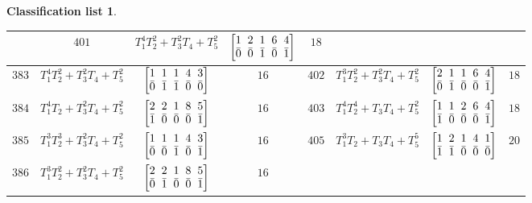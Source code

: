 \documentclass[10pt,a4paper]{amsart}
\theoremstyle{definition}
\newtheorem{class-list}[thm]{Classification list}
\numberwithin{equation}{section}
\begin{document}
\begin{class-list}
\begin{table}[h!]
\begin{tabu}{c|c|c|c||c|c|c|c}
&${401}$&${T_{1}^{4}T_{2}^{2}+T_{3}^{2}T_{4}+T_{5}^{2}}$
&$\arraycolsep=1mm\begin{bmatrix}{1} & {2} & {1} & {6} & {4} \\ {\bar{0}} & {\bar{0}} & {\bar{1}} & {\bar{0}} & {\bar{1}}\end{bmatrix}$&${18}$
\\
\hline
${383}$&${T_{1}^{4}T_{2}^{2}+T_{3}^{2}T_{4}+T_{5}^{2}}$
&$\arraycolsep=1mm\begin{bmatrix}{1} & {1} & {1} & {4} & {3} \\ {\bar{0}} & {\bar{1}} & {\bar{1}} & {\bar{0}} & {\bar{0}}\end{bmatrix}$&${16}$
&${402}$&${T_{1}^{3}T_{2}^{2}+T_{3}^{2}T_{4}+T_{5}^{2}}$
&$\arraycolsep=1mm\begin{bmatrix}{2} & {1} & {1} & {6} & {4} \\ {\bar{0}} & {\bar{1}} & {\bar{0}} & {\bar{0}} & {\bar{1}}\end{bmatrix}$&${18}$
\\
\hline
${384}$&${T_{1}^{4}T_{2}+T_{3}^{2}T_{4}+T_{5}^{2}}$
&$\arraycolsep=1mm\begin{bmatrix}{2} & {2} & {1} & {8} & {5} \\ {\bar{1}} & {\bar{0}} & {\bar{0}} & {\bar{0}} & {\bar{1}}\end{bmatrix}$&${16}$
&${403}$&${T_{1}^{4}T_{2}^{4}+T_{3}T_{4}+T_{5}^{2}}$
&$\arraycolsep=1mm\begin{bmatrix}{1} & {1} & {2} & {6} & {4} \\ {\bar{1}} & {\bar{0}} & {\bar{0}} & {\bar{0}} & {\bar{1}}\end{bmatrix}$&${18}$
\\
\hline
${385}$&${T_{1}^{3}T_{2}^{3}+T_{3}^{2}T_{4}+T_{5}^{2}}$
&$\arraycolsep=1mm\begin{bmatrix}{1} & {1} & {1} & {4} & {3} \\ {\bar{0}} & {\bar{0}} & {\bar{1}} & {\bar{0}} & {\bar{1}}\end{bmatrix}$&${16}$
&${405}$&${T_{1}^{3}T_{2}+T_{3}T_{4}+T_{5}^{5}}$
&$\arraycolsep=1mm\begin{bmatrix}{1} & {2} & {1} & {4} & {1} \\ {\bar{1}} & {\bar{1}} & {\bar{0}} & {\bar{0}} & {\bar{0}}\end{bmatrix}$&${20}$
\\
\hline
${386}$&${T_{1}^{3}T_{2}^{2}+T_{3}^{2}T_{4}+T_{5}^{2}}$
&$\arraycolsep=1mm\begin{bmatrix}{2} & {2} & {1} & {8} & {5} \\ {\bar{0}} & {\bar{1}} & {\bar{0}} & {\bar{0}} & {\bar{1}}\end{bmatrix}$&${16}$

\end{tabu}
\end{table}
\end{class-list}
\end{document}

